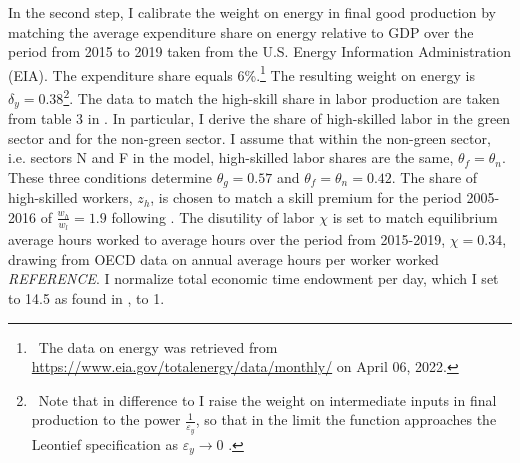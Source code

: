 In the second step, I calibrate the weight on energy in final good production by matching the average expenditure share on energy relative to GDP over the period from 2015 to 2019 taken from the U.S. Energy Information Administration (EIA). The expenditure share equals 6\%.\footnote{\ The data on energy was retrieved from \url{https://www.eia.gov/totalenergy/data/monthly/}
 on April 06, 2022.} The resulting weight on energy is $\delta_y=0.38$\footnote{\ Note that in difference to \cite{Fried2018ClimateAnalysis} I raise the weight on intermediate inputs in final production to the power $\frac{1}{\varepsilon_y}$, so that in the limit the function approaches the Leontief specification as $\varepsilon_y\rightarrow 0$ \citep{Herrendorf2014GrowthTransformation}.}. The data to match the high-skill share in labor production are taken from table 3 in \cite{Consoli2016DoCapital}. In particular, I derive the share of high-skilled labor in the green sector and for the non-green sector. I assume that within the non-green sector, i.e. sectors N and F in the model, high-skilled labor shares are the same, $\theta_f=\theta_n$.  These three conditions determine $\theta_g=0.57$ and $\theta_f=\theta_n=0.42$. The share of high-skilled workers, $z_h$, is chosen to match a skill premium for the period 2005-2016 of $\frac{w_h}{w_l}=1.9$ following \cite{Slavik2020WagePremium}. The disutility of labor $\chi$ is set to match equilibrium average hours worked to average hours over the period from 2015-2019, $\chi=0.34$, drawing from OECD data on annual average hours per worker worked \textit{REFERENCE}. I normalize total economic time endowment per day, which I set to 14.5 as found in \cite{Jones1993OptimalGrowth}, to 1. 

